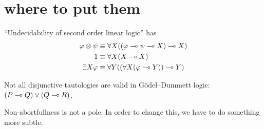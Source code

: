 \section*{where to put them}

``Undecidability of second order linear logic'' has
\begin{align*}
 \varphi\otimes \psi&\equiv \forall X((\varphi\multimap\psi\multimap X)\multimap X) \\
 {1}      &\equiv \forall X(X\multimap X)\\
 \exists X\varphi   &\equiv \forall Y((\forall X(\varphi\multimap Y))\multimap Y)
\end{align*}

Not all disjunctive tautologies are valid in G\"odel--Dummett logic:
$(P\multimap Q)\lor(Q\multimap R)$.

Non-abortfullness is not a pole.
In order to change this, we have to do something more subtle.
